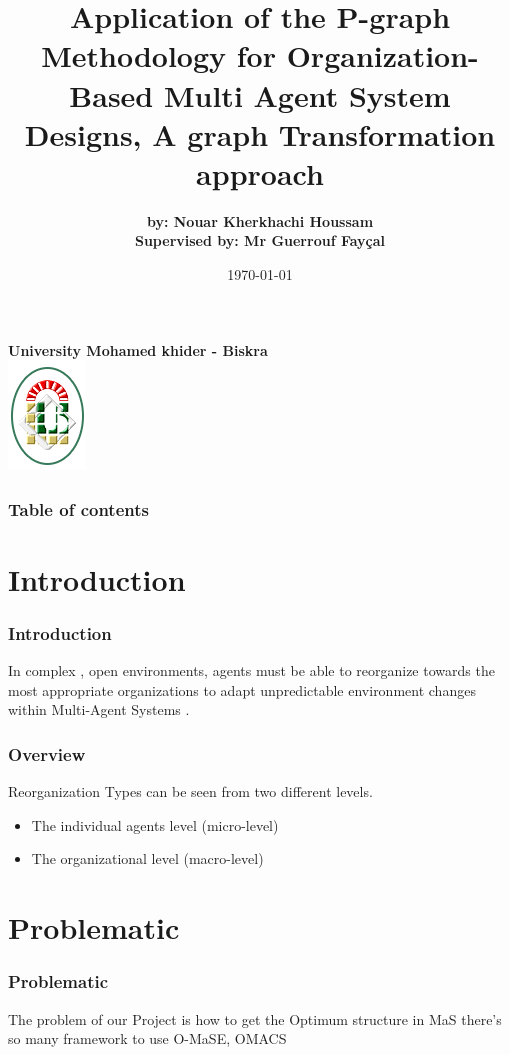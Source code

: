 \documentclass[12pt]{beamer}
\title[Application of the P-graph Methodology]{
Application of the P-graph Methodology for Organization-Based Multi Agent System Designs, A graph Transformation approach }
\author[EL-Houssam]{\textbf {by: Nouar Kherkhachi Houssam \\ \footnotesize Supervised by: Mr Guerrouf Fay\c{c}al}} %
\date{\today}
\institute[Biskra University]{}
\begin{document}
\begin{frame}

\begin{center}
	\textbf { University Mohamed khider - Biskra} \\
	\includegraphics[scale=0.7]{logo.png}
\end{center}

\titlepage
\end{frame} 


\begin{frame}
\frametitle{Table of contents}
\tableofcontents
\end{frame} 


\section{Introduction} 
\begin{frame}
\frametitle{Introduction} 

\begin{center}
In complex , open environments, agents must be able to reorganize 
 towards the most appropriate organizations to adapt unpredictable environment changes within Multi-Agent Systems .
\end{center}

\end{frame}


\begin{frame}
\frametitle{Overview} 
\begin{center}
Reorganization Types can be seen from two different levels. 
\begin{itemize}
	\item The individual agents level (micro-level) 
	\item The organizational level (macro-level) 
\end{itemize}
\end{center}
\end{frame}
\section{Problematic} 
\begin{frame}
\frametitle{Problematic} 
\begin{center}
The problem of our Project is how to get the Optimum structure  
in MaS there's so many framework to use  O-MaSE, OMACS
\end{center}
\end{frame}
\end{document}
